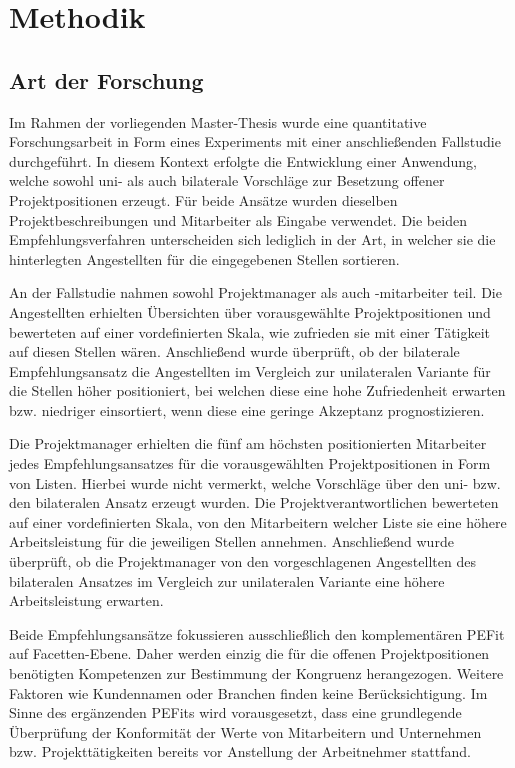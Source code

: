 \chapter{Methodik}
\label{ch:methodik}

\section{Art der Forschung}
\label{ch:methodik:art}
Im Rahmen der vorliegenden Master-Thesis wurde eine quantitative Forschungsarbeit in Form eines Experiments mit einer anschließenden Fallstudie durchgeführt. In diesem Kontext erfolgte die Entwicklung einer Anwendung, welche sowohl uni- als auch bilaterale Vorschläge zur Besetzung offener Projektpositionen erzeugt. Für beide Ansätze wurden dieselben Projektbeschreibungen und Mitarbeiter als Eingabe verwendet. Die beiden Empfehlungsverfahren unterscheiden sich lediglich in der Art, in welcher sie die hinterlegten Angestellten für die eingegebenen Stellen sortieren.

An der Fallstudie nahmen sowohl Projektmanager als auch -mitarbeiter teil. Die Angestellten erhielten Übersichten über vorausgewählte Projektpositionen und bewerteten auf einer vordefinierten Skala, wie zufrieden sie mit einer Tätigkeit auf diesen Stellen wären. Anschließend wurde überprüft, ob der bilaterale Empfehlungsansatz die Angestellten im Vergleich zur unilateralen Variante für die Stellen höher positioniert, bei welchen diese eine hohe Zufriedenheit erwarten bzw. niedriger einsortiert, wenn diese eine geringe Akzeptanz prognostizieren.

Die Projektmanager erhielten die fünf am höchsten positionierten Mitarbeiter jedes Empfehlungsansatzes für die vorausgewählten Projektpositionen in Form von Listen. Hierbei wurde nicht vermerkt, welche Vorschläge über den uni- bzw. den bilateralen Ansatz erzeugt wurden. Die Projektverantwortlichen bewerteten auf einer vordefinierten Skala, von den Mitarbeitern welcher Liste sie eine höhere Arbeitsleistung für die jeweiligen Stellen annehmen. Anschließend wurde überprüft, ob die Projektmanager von den vorgeschlagenen Angestellten des bilateralen Ansatzes im Vergleich zur unilateralen Variante eine höhere Arbeitsleistung erwarten.

Beide Empfehlungsansätze fokussieren ausschließlich den komplementären \ac{PEFit} auf Facetten-Ebene. Daher werden einzig die für die offenen Projektpositionen benötigten Kompetenzen zur Bestimmung der Kongruenz herangezogen. Weitere Faktoren wie Kundennamen oder Branchen finden keine Berücksichtigung. Im Sinne des ergänzenden \acp{PEFit} wird vorausgesetzt, dass eine grundlegende Überprüfung der Konformität der Werte von Mitarbeitern und Unternehmen bzw. Projekttätigkeiten bereits vor Anstellung der Arbeitnehmer stattfand.

